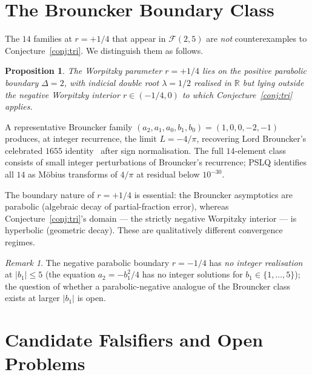 \documentclass[11pt]{amsart}
\newtheorem{proposition}[theorem]{Proposition}
\theoremstyle{definition}
\theoremstyle{remark}
\newtheorem{remark}[theorem]{Remark}
\newcommand{\FF}{\mathcal{F}}
\begin{document}
\section{The Brouncker Boundary Class}\label{sec:brouncker}

The $14$ families at $r = +1/4$ that appear in $\FF(2,5)$ are
\emph{not} counterexamples to Conjecture~\ref{conj:tri}.  We
distinguish them as follows.

\begin{proposition}\label{prop:brouncker-boundary}
The Worpitzky parameter $r = +1/4$ lies on the positive parabolic
boundary $\Delta = 2$, with indicial double root $\lambda = 1/2$
realised in $\mathbb{R}$ but lying \emph{outside} the negative
Worpitzky interior $r \in (-1/4, 0)$ to which
Conjecture~\ref{conj:tri} applies.
\end{proposition}

A representative Brouncker family $(a_2, a_1, a_0, b_1, b_0) =
(1, 0, 0, -2, -1)$ produces, at integer recurrence, the limit
$L = -4/\pi$, recovering Lord Brouncker's celebrated
$1655$ identity~\cite{Brouncker} after sign normalisation.  The full
$14$-element class consists of small integer perturbations of
Brouncker's recurrence; PSLQ identifies all $14$ as M\"obius
transforms of $4/\pi$ at residual below $10^{-30}$.

The boundary nature of $r = +1/4$ is essential: the Brouncker
asymptotics are parabolic (algebraic decay of partial-fraction error),
whereas Conjecture~\ref{conj:tri}'s domain --- the strictly negative
Worpitzky interior --- is hyperbolic (geometric decay).  These are
qualitatively different convergence regimes.

\begin{remark}
The negative parabolic boundary $r = -1/4$ has \emph{no integer
realisation} at $|b_1| \le 5$ (the equation $a_2 = -b_1^2/4$ has no
integer solutions for $b_1 \in \{1,\dots,5\}$); the question of
whether a parabolic-negative analogue of the Brouncker class exists
at larger $|b_1|$ is open.
\end{remark}

\section{Candidate Falsifiers and Open Problems}\label{sec:open}
\end{document}
